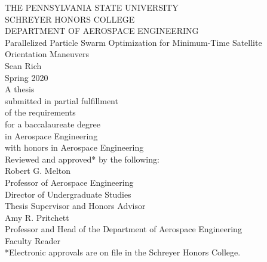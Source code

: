 
\begin{titlepage}
\center %

\vspace*{1.0cm}
THE PENNSYLVANIA STATE UNIVERSITY\\
SCHREYER HONORS COLLEGE\\[1.0cm]
DEPARTMENT OF AEROSPACE ENGINEERING\\[1.0cm]
Parallelized Particle Swarm Optimization for Minimum-Time Satellite Orientation Maneuvers \\[1.0cm]
Sean Rich\\
Spring 2020\\[1.0cm]
A thesis\\
submitted in partial fulfillment\\
of the requirements\\
for a baccalaureate degree\\
in Aerospace Engineering\\
with honors in Aerospace Engineering\\[1.0cm]

Reviewed and approved* by the following:\\[0.5cm]
Robert G. Melton\\
Professor of Aerospace Engineering\\
Director of Undergraduate Studies\\
Thesis Supervisor and Honors Advisor\\[0.5cm]

Amy R. Pritchett\\
Professor and Head of the Department of Aerospace Engineering\\
Faculty Reader\\[0.5cm]

*Electronic approvals are on file in the Schreyer Honors College.

\end{titlepage}
